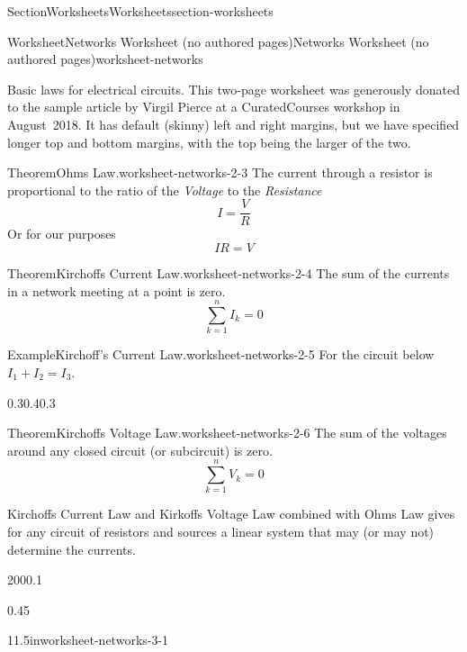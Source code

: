 \documentclass[twoside,10pt,]{article}
\numberwithin{equation}{section}
\begin{document}
\begin{sectionptx}{Section}{Worksheets}{}{Worksheets}{}{}{section-worksheets}
\begin{worksheet-subsection}{Worksheet}{Networks Worksheet (no authored pages)}{}{Networks Worksheet (no authored pages)}{}{}{worksheet-networks}
\begin{introduction}{Basic laws for electrical circuits.}
This two-page worksheet was generously donated to the sample article by Virgil Pierce at a CuratedCourses workshop in August~2018.  It has default (skinny) left and right margins, but we have specified longer top and bottom margins, with the top being the larger of the two.%
\begin{theorem}{Theorem}{Ohms Law.}{}{worksheet-networks-2-3}%
The current through a resistor is proportional to the ratio of the \emph{Voltage} to the \emph{Resistance}%
\begin{equation*}
I = \frac{V}{R} 
\end{equation*}
Or for our purposes%
\begin{equation*}
I R = V 
\end{equation*}
%
\end{theorem}
\begin{theorem}{Theorem}{Kirchoffs Current Law.}{}{worksheet-networks-2-4}%
The sum of the currents in a network meeting at a point is zero.%
\begin{equation*}
\sum_{k=1}^n I_k = 0 
\end{equation*}
%
\end{theorem}
\begin{example}{Example}{Kirchoff's Current Law.}{worksheet-networks-2-5}%
For the circuit below \(I_1 + I_2 = I_3 \).%
\begin{image}{0.3}{0.4}{0.3}{}%
%
\end{image}%
\end{example}
\begin{theorem}{Theorem}{Kirchoffs Voltage Law.}{}{worksheet-networks-2-6}%
The sum of the voltages around any closed circuit (or subcircuit) is zero.%
\begin{equation*}
\sum_{k=1}^n V_k = 0 
\end{equation*}
%
\end{theorem}
Kirchoffs Current Law and Kirkoffs Voltage Law combined with Ohms Law gives for any circuit of resistors and sources a linear system that may (or may not) determine the currents.%
\end{introduction}%
\begin{sidebyside}{2}{0}{0}{0.1}%
\begin{sbspanel}{0.45}%
\begin{divisionexercise}{1}{}{1.5in}{worksheet-networks-3-1}%

\end{divisionexercise}
\end{sbspanel}
\end{sidebyside}
\end{worksheet-subsection}
\end{sectionptx}
\end{document}
